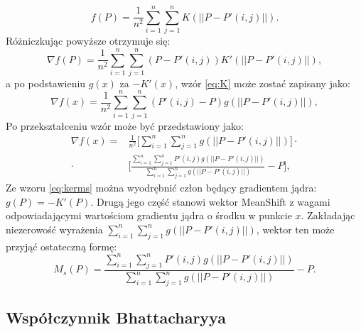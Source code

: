 \begin{equation}
f(P)=\frac{1}{n^2}\sum_{i=1}^{n}\sum_{j=1}^{n}K(||P-P'(i,j)||).
\end{equation}
Różniczkując powyższe otrzymuje się:
\begin{equation}
\label{eq:K}
\nabla f(P)=\frac{1}{n^2}\sum_{i=1}^{n}\sum_{j=1}^{n}(P-P'(i,j))K'(||P-P'(i,j)||),
\end{equation}
a po podstawieniu $g(x)$ za $-K'(x)$, wzór \eqref{eq:K} może zostać zapisany jako:
\begin{equation}
\nabla f(x)=\frac{1}{n^2}\sum_{i=1}^{n}\sum_{j=1}^{n}(P'(i,j)-P)g(||P-P'(i,j)||),
\end{equation}
Po przekształceniu wzór może być przedstawiony jako:
\begin{equation}
\label{eq:kerms}
\begin{aligned}
\nabla f(x)= &\frac{1}{n^2}\bigg[\sum_{i=1}^{n}\sum_{j=1}^{n}g(||P-P'(i,j)||)\bigg] \cdot\\ \cdot&\bigg[\frac{\sum_{i=1}^{n}\sum_{j=1}^{n}P'(i,j)g(||P-P'(i,j)||)}{\sum_{i=1}^{n}\sum_{j=1}^{n}g(||P-P'(i,j)||)} -P\bigg],
\end{aligned}
\end{equation}
Ze wzoru \eqref{eq:kerms} można wyodrębnić człon będący gradientem jądra: $g(P)=-K'(P)$. 
Drugą jego część stanowi wektor MeanShift z wagami odpowiadającymi wartościom gradientu jądra o środku w punkcie $x$. 
Zakładając niezerowość wyrażenia $\sum_{i=1}^{n}\sum_{j=1}^{n}g(||P-P'(i,j)||)$, wektor ten może przyjąć ostateczną formę:
\begin{equation}
M_s(P)=\frac{\sum_{i=1}^{n}\sum_{j=1}^{n}P'(i,j)g(||P-P'(i,j)||)}{\sum_{i=1}^{n}\sum_{j=1}^{n}g(||P-P'(i,j)||)} -P.
\end{equation}

\subsection{Współczynnik Bhattacharyya}
 \label{ssec:Bhat}

